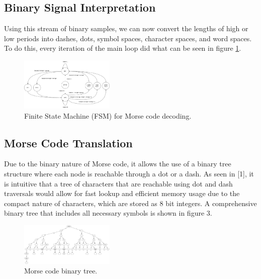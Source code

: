 \documentclass[head=13.6pt]{cce2014-design}
\begin{document}
\subsection{Binary Signal Interpretation}
Using this stream of binary samples, we can now convert the lengths of high or low periods into dashes, dots, symbol spaces, character spaces, and word spaces. To do this, every iteration of the main loop did what can be seen in figure \ref{FSM}.

\begin{figure}[tb]
    \centering
    \includegraphics[width=0.4\textwidth]{images/fsm.png}
    \caption{Finite State Machine (FSM) for Morse code decoding.}
    \label{FSM}
\end{figure}

\subsection{Morse Code Translation}
Due to the binary nature of Morse code, it allows the use of a binary tree structure where each node is reachable through a dot or a dash. As seen in [1], it is intuitive that a tree of characters that are reachable using dot and dash traversals would allow for fast lookup and efficient memory usage due to the compact nature of characters, which are stored as 8 bit integers. A comprehensive binary tree that includes all necessary symbols is shown in figure 3.

\begin{figure}[tb]
    \centering
    \includegraphics[width=0.4\textwidth]{images/morse_tree.png}
    \caption{Morse code binary tree.}
    \label{morsetree}
\end{figure}
\end{document}
